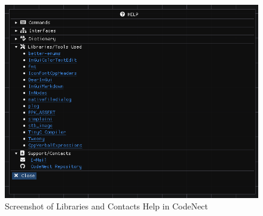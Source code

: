 \begin{figure}[H]
	\centering
	\captionsetup{justification=centering}
	\captionsetup[figure]{list=yes}
	\includegraphics[width=\linewidth]{media/sc_help_libs_and_contacts.png}
	\caption[Screenshot of Libraries and Contacts Help in CodeNect]{Screenshot of Libraries and Contacts Help in CodeNect}
	\label{fig:cn_libs_and_contacts}
\end{figure}
